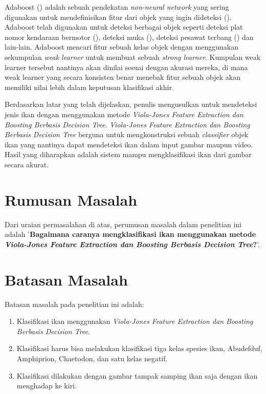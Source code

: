 Adaboost (\cite{freundetal}) adalah sebuah pendekatan \textit{non-neural network} 
yang sering digunakan untuk mendefinisikan fitur dari objek yang ingin 
dideteksi (\cite{weber}). Adaboost telah digunakan untuk deteksi berbagai objek 
seperti deteksi plat nomor kendaraan bermotor (\cite{hoetal}), deteksi muka 
(\cite{violaetal}), deteksi pesawat terbang (\cite{freundetal}) dan lain-lain. 
Adaboost mencari fitur sebuah kelas objek dengan menggunakan sekumpulan 
\emph{weak learner} untuk membuat sebuah \emph{strong learner}. 
Kumpulan weak learner tersebut nantinya akan dinilai sesuai dengan akurasi 
mereka, di mana weak learner yang secara konsisten benar menebak fitur sebuah 
objek akan memiliki nilai lebih dalam keputusan klasifikasi akhir.

Berdasarkan latar yang telah dijelaskan, penulis mengusulkan untuk mendeteksi 
jenis ikan dengan menggunakan metode \emph{Viola-Jones Feature Extraction dan Boosting Berbasis 
	Decision Tree}. 
\emph{Viola-Jones Feature Extraction dan Boosting Berbasis 
	Decision Tree} berguna untuk 
mengkonstruksi sebuah \emph{classifier} objek ikan yang nantinya dapat mendeteksi 
ikan dalam input gambar maupun video. Hasil yang diharapkan adalah sistem 
mampu mengklasifikasi ikan dari gambar secara akurat.

\section{Rumusan Masalah}
Dari uraian permasalahan di atas, perumusan masalah dalam penelitian ini adalah 
'\textbf{Bagaimana caranya mengklasifikasi ikan menggunakan metode 
\textit{Viola-Jones Feature Extraction dan Boosting Berbasis 
	Decision Tree}?}'.

\section{Batasan Masalah}
Batasan masalah pada penelitian ini adalah:
\begin{enumerate}
	\item Klasifikasi ikan menggunakan \textit{Viola-Jones Feature Extraction dan Boosting Berbasis 
	Decision Tree}.
	\item Klasifikasi harus bisa melakukan klasifikasi tiga kelas spesies ikan, Abudefduf, Amphiprion, Chaetodon, 
	dan satu kelas negatif.
	\item Klasifikasi dilakukan dengan gambar tampak samping ikan saja dengan ikan menghadap ke kiri.
\end{enumerate}

